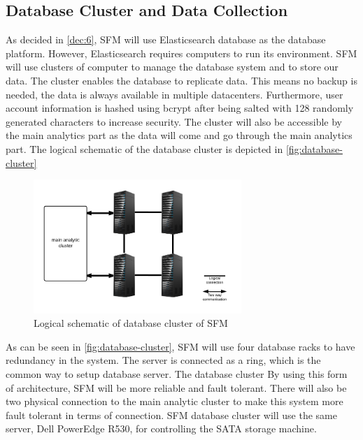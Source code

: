 \subsection{Database Cluster and Data Collection}
\label{subsec:database-data}
As decided in \ref{dec:6}, SFM will use Elasticsearch database as the database platform. However, Elasticsearch requires computers to run its environment. SFM will use clusters of computer to manage the database system and to store our data. The cluster enables the database to replicate data. This means no backup is needed, the data is always available in multiple datacenters. Furthermore, user account information is hashed using bcrypt after being salted with 128 randomly generated characters to increase security. The cluster will also be accessible by the main analytics part as the data will come and go through the main analytics part. The logical schematic of the database cluster is depicted in \autoref{fig:database-cluster}

\begin{figure}[H]
\centering
\includegraphics[width=0.7\textwidth]{6-hardware/images/db-cluster.png}
\caption{Logical schematic of database cluster of SFM}
\label{fig:database-cluster}
\end{figure}

As can be seen in \autoref{fig:database-cluster}, SFM will use four database racks to have redundancy in the system. The server is connected as a ring, which is the common way to setup database server. The database cluster By using this form of architecture, SFM will be more reliable and fault tolerant. There will also be two physical connection to the main analytic cluster to make this system more fault tolerant in terms of connection. SFM database cluster will use the same server, Dell PowerEdge R530, for controlling the SATA storage machine.


